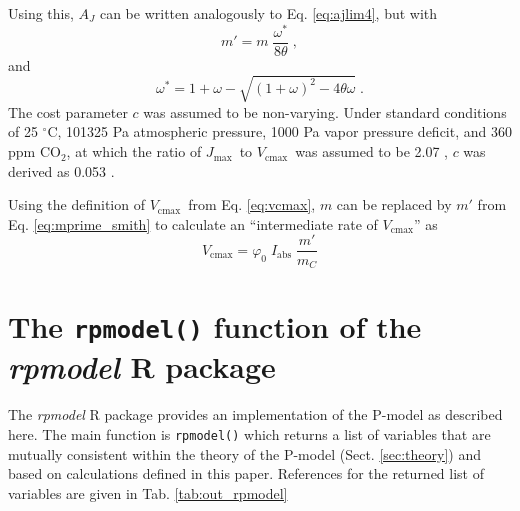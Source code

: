\documentclass[gmd, manuscript]{copernicus}
\newcommand{\coo}{CO$_2$}
\newcommand{\vcmax}{$V_{\text{cmax}}$}
\newcommand{\jmax}{$J_{\text{max}}$}
\begin{document}
Using this, $A_J$ can be written analogously to Eq. \ref{eq:ajlim4}, but with 
\begin{equation}
\label{eq:mprime_smith}
    m' = m \; \frac{\omega^{\ast}}{8 \theta} \;,
\end{equation}
and 
\begin{equation}
    \omega^{\ast} = 1 + \omega - \sqrt{\left(1 + \omega \right)^2 -
    4  \theta \omega} \;.
\end{equation}
The cost parameter $c$ was assumed to be non-varying. Under
standard conditions of 25 $^{\circ}$C, 101325 Pa atmospheric pressure, 1000 Pa vapor pressure deficit, and 360 ppm \coo , at which the ratio of \jmax\ to \vcmax\ was assumed to be 2.07  \citep{smithdukes17}, $c$ was derived as 0.053 \citep{smith19ecollett}.

Using the definition of \vcmax\ from Eq. \ref{eq:vcmax}, $m$ can be replaced by $m'$ from Eq. \ref{eq:mprime_smith} to calculate an ``intermediate rate of \vcmax'' \citep{smith19ecollett} as
\begin{equation}
    V_\text{cmax} = \varphi_0 \; I_{\mathrm{abs}} \; \frac{m'}{m_C}
\end{equation}

\section{The \texttt{rpmodel()} function of the \textit{rpmodel} R package}

The \textit{rpmodel} R package provides an implementation of the P-model as described here. The main function is \texttt{rpmodel()} which returns a list of variables that are mutually consistent within the theory of the P-model (Sect. \ref{sec:theory}) and based on calculations defined in this paper. References for the returned list of variables are given in Tab. \ref{tab:out_rpmodel}

\noappendix       %



\end{document}
